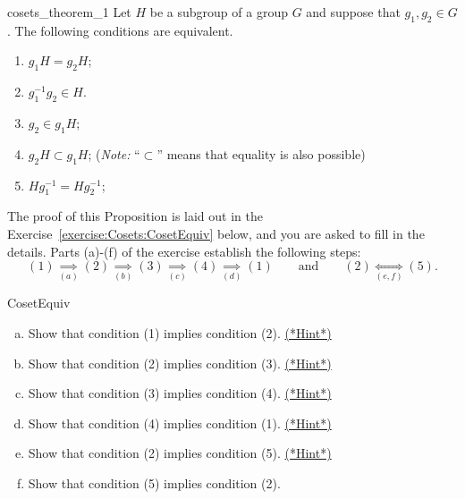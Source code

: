 \begin{prop}{cosets_theorem_1}
Let $H$ be a subgroup of a group $G$ and suppose that $g_1, g_2 \in G$.  The following conditions are equivalent.  
\begin{enumerate}
 
\item
$g_1 H = g_2 H$; 

\item
$g_1^{-1} g_2 \in H$.

\item
$g_2 \in g_1 H$; 

\item
$g_2 H \subset g_1 H$; \qquad (\emph{Note:} ``$\subset$'' means that equality is also possible)

\item
$H g_1^{-1}  = H g_2^{-1}$; 


 \end{enumerate}
\end{prop}
The proof of this Proposition is laid out in the Exercise~\ref{exercise:Cosets:CosetEquiv} below, and you are asked to fill in the details. Parts (a)-(f) of the exercise establish the following steps:
\[ (1) \underset{(a)}\implies (2) \underset{(b)}\implies (3) \underset{(c)}\implies (4) \underset{(d)}\implies (1) \qquad \text{and} \qquad (2) \underset{(e,f)}\Leftrightarrow (5). \]


\begin{exercise}{CosetEquiv}
\begin{enumerate}[(a)]
\item
Show that condition (1) implies condition (2).  
\hyperref[sec:Cosets:Hints]{(*Hint*)}

\item
Show that condition (2) implies condition (3).
\hyperref[sec:Cosets:Hints]{(*Hint*)}


\item
Show that condition (3) implies condition (4).
\hyperref[sec:Cosets:Hints]{(*Hint*)}

\item
Show that condition (4) implies condition (1).
\hyperref[sec:Cosets:Hints]{(*Hint*)}

\item
Show that condition (2) implies condition (5).
\hyperref[sec:Cosets:Hints]{(*Hint*)}

\item
Show that condition (5) implies condition (2).
\end{enumerate}
\end{exercise}

